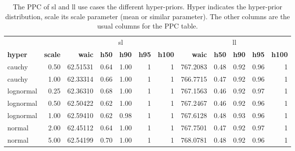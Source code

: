 \documentclass[twoside,11pt,preprint]{article}
\begin{document}
\begin{table}

\caption{\label{tab:hyperxz2}\label{tab:hyper1b}The PPC of sl and ll use cases the different hyper-priors. Hyper indicates the hyper-prior distribution, scale its scale parameter (mean or similar parameter). The other columns are the usual columns for the PPC table.}
\centering
\begin{tabular}[t]{lrrrrrrrrrrr}
\toprule
\multicolumn{2}{c}{ } & \multicolumn{5}{c}{sl} & \multicolumn{5}{c}{ll} \\
\cmidrule(l{3pt}r{3pt}){3-7} \cmidrule(l{3pt}r{3pt}){8-12}
\textbf{\textbf{hyper}} & \textbf{\textbf{scale}} & \textbf{\textbf{waic}} & \textbf{\textbf{h50}} & \textbf{\textbf{h90}} & \textbf{\textbf{h95}} & \textbf{\textbf{h100}} & \textbf{\textbf{waic}} & \textbf{\textbf{h50}} & \textbf{\textbf{h90}} & \textbf{\textbf{h95}} & \textbf{\textbf{h100}}\\
\midrule
cauchy & 0.50 & 62.51531 & 0.64 & 1.00 & 1 & 1 & 767.2083 & 0.48 & 0.92 & 0.96 & 1\\
cauchy & 1.00 & 62.33314 & 0.66 & 1.00 & 1 & 1 & 766.7715 & 0.47 & 0.92 & 0.96 & 1\\
lognormal & 0.25 & 62.36310 & 0.68 & 1.00 & 1 & 1 & 767.1563 & 0.46 & 0.92 & 0.97 & 1\\
lognormal & 0.50 & 62.50422 & 0.62 & 1.00 & 1 & 1 & 767.2467 & 0.46 & 0.92 & 0.96 & 1\\
lognormal & 1.00 & 62.59410 & 0.62 & 0.98 & 1 & 1 & 767.6128 & 0.48 & 0.93 & 0.96 & 1\\
\addlinespace
normal & 2.00 & 62.45112 & 0.64 & 1.00 & 1 & 1 & 767.7501 & 0.47 & 0.92 & 0.97 & 1\\
normal & 5.00 & 62.54199 & 0.70 & 1.00 & 1 & 1 & 768.0781 & 0.48 & 0.92 & 0.96 & 1\\
\bottomrule
\end{tabular}
\end{table}

\newpage

\vskip 0.2in

\end{document}
